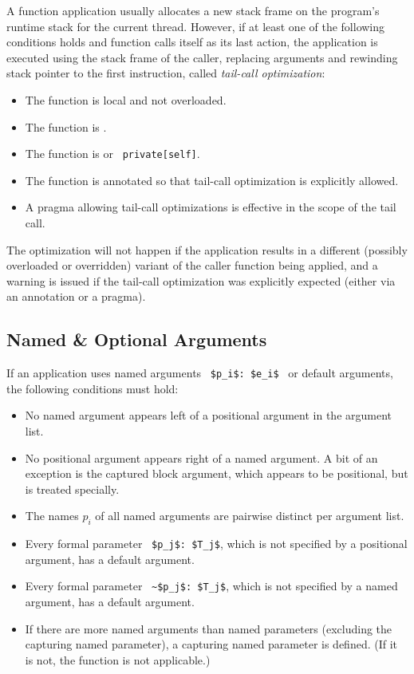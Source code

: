 A function application usually allocates a new stack frame on the program's runtime stack for the current thread. However, if at least one of the following conditions holds and function calls itself as its last action, the application is executed using the stack frame of the caller, replacing arguments and rewinding stack pointer to the first instruction, called {\em tail-call optimization}:
\begin{itemize}
\item The function is local and not overloaded. 
\item The function is . 
\item The function is  or ~\lstinline!private[self]!. 
\item The function is annotated so that tail-call optimization is explicitly allowed. 
\item A pragma allowing tail-call optimizations is effective in the scope of the tail call. 
\end{itemize}
The optimization will not happen if the application results in a different (possibly overloaded or overridden) variant of the caller function being applied, and a warning is issued if the tail-call optimization was explicitly expected (either via an annotation or a pragma). 





\subsection{Named \& Optional Arguments}
\label{sec:named-optional-arguments}

If an application uses named arguments ~\lstinline!$p_i$: $e_i$!~ or default arguments, the following conditions must hold:
\begin{itemize}
\item No named argument appears left of a positional argument in the argument list. 
\item No positional argument appears right of a named argument. A bit of an exception is the captured block argument, which appears to be positional, but is treated specially. 
\item The names $p_i$ of all named arguments are pairwise distinct per argument list.
\item Every formal parameter ~\lstinline!$p_j$: $T_j$!, which is not specified by a positional argument, has a default argument. 
\item Every formal parameter ~\lstinline!~$p_j$: $T_j$!, which is not specified by a named argument, has a default argument. 
\item If there are more named arguments than named parameters (excluding the capturing named parameter), a capturing named parameter is defined. (If it is not, the function is not applicable.)
\end{itemize}

